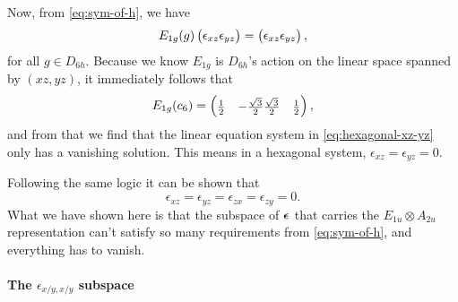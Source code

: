 \documentclass[hyperref, a4paper, 12pt]{article}
\def\\{}%
\begin{document}
Now, from \eqref{eq:sym-of-h}, we have 
\begin{equation}
    E_{1g}(g) \pmqty{\epsilon_{xz} \\ \epsilon_{yz}} = \pmqty{\epsilon_{xz} \\ \epsilon_{yz}},
    \label{eq:hexagonal-xz-yz}
\end{equation}
for all $g \in D_{6h}$.
Because we know $E_{1g}$ is $D_{6h}$'s action on the linear space spanned by $(xz, yz)$,
it immediately follows that 
\begin{equation}
    E_{1g}(c_6) = \pmqty{
        \frac{1}{2} & - \frac{\sqrt{3}}{2} \\
        \frac{\sqrt{3}}{2} & \frac{1}{2}
    },
\end{equation}
and from that we find that the linear equation system in \eqref{eq:hexagonal-xz-yz}
only has a vanishing solution.
This means in a hexagonal system, $\epsilon_{xz} = \epsilon_{yz} = 0$.

Following the same logic it can be shown that 
\begin{equation}
    \epsilon_{xz} = \epsilon_{yz} = \epsilon_{zx} = \epsilon_{zy} = 0.
\end{equation}
What we have shown here is that the subspace of $\vb*{\epsilon}$ that carries the 
$E_{1u} \otimes A_{2u}$ representation can't satisfy so many requirements from \eqref{eq:sym-of-h},
and everything has to vanish.

\paragraph*{The $\epsilon_{x/y, x/y}$ subspace}
\end{document}
